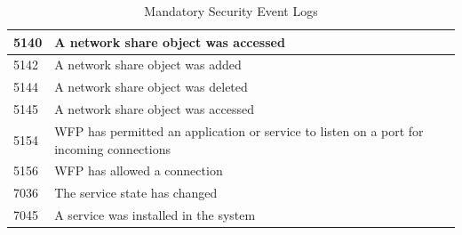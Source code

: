 \begin{table}[H]
\begin{tabular}{| p{1.5cm} | p{14.5cm} |}
        5140 & A network share object was accessed \\ \hline
        5142 & A network share object was added \\ \hline
        5144 & A network share object was deleted \\ \hline
        5145 & A network share object was accessed \\ \hline
        5154 & WFP has permitted an application or service to listen on a port for incoming connections \\ \hline
        5156 & WFP has allowed a connection \\ \hline
        7036\footnotemark[1] & The service state has changed \\ \hline
        7045\footnotemark[1] & A service was installed in the system \\ \hline
    \end{tabular}
    \caption{Mandatory Security Event Logs}
\end{table}

\clearpage

